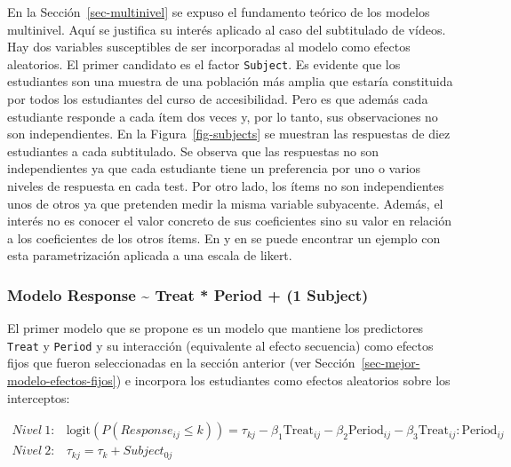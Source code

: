 \documentclass[
  12pt,
  a4paper,
  extrafontsizes,
  onecolumn,
  openright,
  table]{memoir}
\begin{document}
En la Sección~\ref{sec-multinivel} se expuso el fundamento teórico de
los modelos multinivel. Aquí se justifica su interés aplicado al caso
del subtitulado de vídeos. Hay dos variables susceptibles de ser
incorporadas al modelo como efectos aleatorios. El primer candidato es
el factor \texttt{Subject}. Es evidente que los estudiantes son una
muestra de una población más amplia que estaría constituida por todos
los estudiantes del curso de \gls{accesibilidad}. Pero es que además
cada estudiante responde a cada ítem dos veces y, por lo tanto, sus
observaciones no son independientes. En la Figura~\ref{fig-subjects} se
muestran las respuestas de diez estudiantes a cada subtitulado. Se
observa que las respuestas no son independientes ya que cada estudiante
tiene un preferencia por uno o varios niveles de respuesta en cada test.
Por otro lado, los ítems no son independientes unos de otros ya que
pretenden medir la misma variable subyacente. Además, el interés no es
conocer el valor concreto de sus coeficientes sino su valor en relación
a los coeficientes de los otros ítems. En
\textcite[pp.~14-16]{burkner2021} y en \textcite[pp.~19-20]{burkner2019}
se puede encontrar un ejemplo con esta parametrización aplicada a una
\gls{escala de likert}.

\hypertarget{modelo-response-treat-period-1-subject}{%
\subsubsection{Modelo Response \textasciitilde{} Treat * Period + (1
\textbar{} Subject)}\label{modelo-response-treat-period-1-subject}}

El primer modelo que se propone es un modelo que mantiene los
predictores \texttt{Treat} y \texttt{Period} y su interacción
(equivalente al \gls{efecto secuencia}) como efectos fijos que fueron
seleccionadas en la sección anterior (ver
Sección~\ref{sec-mejor-modelo-efectos-fijos}) e incorpora los
estudiantes como efectos aleatorios sobre los interceptos:

\small

\[
\begin{aligned}
Nivel\ 1: & \text{logit}(P(Response_{ij} \leq k)) = \tau_{kj} - \beta_1 \text{Treat}_{ij} - \beta_2 \text{Period}_{ij} - \beta_3 \text{Treat}_{ij} : \text{Period}_{ij} \\
Nivel\ 2: & \tau_{kj}  =  \tau_{k} + Subject_{0j}
\end{aligned}
\]

\normalsize
\end{document}

